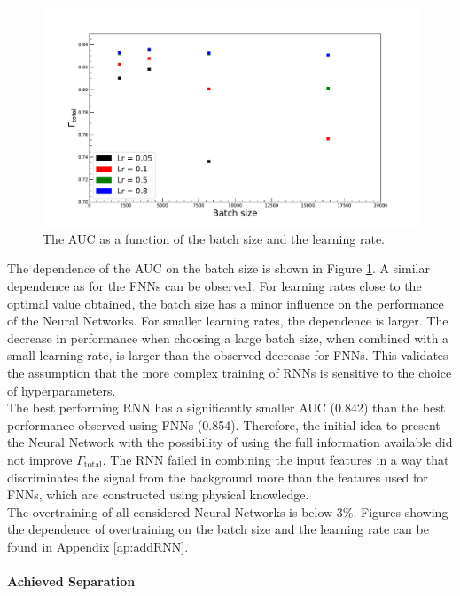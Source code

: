 \begin{figure}[H]
\centering
\includegraphics[width=\linewidth]{figs/RNN/BatchOv_Fixed}
\caption{The AUC as a function of the batch size and the learning rate.}
\label{fig:BatchRNN}
\end{figure}

The dependence of the AUC on the batch size is shown in Figure \ref{fig:BatchRNN}. A similar dependence as for the FNNs can be observed. For learning rates close to the optimal value obtained, the batch size has a minor influence on the performance of the Neural Networks. For smaller learning rates, the dependence is larger. The decrease in performance when choosing a large batch size, when combined with a small learning rate, is larger than the observed decrease for FNNs. This validates the assumption that the more complex training of RNNs is sensitive to the choice of hyperparameters. \\
The best performing RNN has a significantly smaller AUC (0.842) than the best performance observed using FNNs (0.854). Therefore, the initial idea to present the Neural Network with the possibility of using the full information available did not improve $\Gamma_{\text{total}}$. The RNN failed in combining the input features in a way that discriminates the signal from the background more than the features used for FNNs, which are constructed using physical knowledge. \\
The overtraining of all considered Neural Networks is below 3\%. Figures showing the dependence of overtraining on the batch size and the learning rate can be found in Appendix \ref{ap:addRNN}.

\newpage

\paragraph{Achieved Separation} \mbox{} \\

